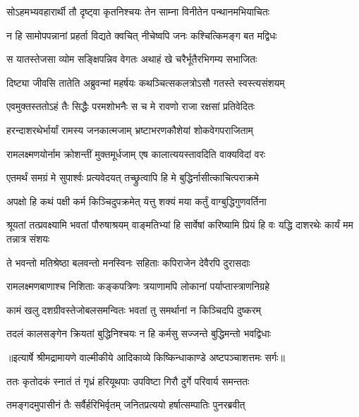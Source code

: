 \twolineshloka
{सोऽहमभ्यवहारार्थी तौ दृष्ट्वा कृतनिश्चयः}
{तेन साम्ना विनीतेन पन्थानमभियाचितः} %

\twolineshloka
{न हि सामोपपन्नानां प्रहर्ता विद्यते क्वचित्}
{नीचेष्वपि जनः कश्चित्किमङ्ग बत मद्विधः} %

\twolineshloka
{स यातस्तेजसा व्योम सङ्क्षिपन्निव वेगतः}
{अथाहं खे चरैर्भूतैरभिगम्य सभाजितः} %

\twolineshloka
{दिष्ट्या जीवसि तातेति अब्रुवन्मां महर्षयः}
{कथञ्चित्सकलत्रोऽसौ गतस्ते स्वस्त्यसंशयम्} %

\twolineshloka
{एवमुक्तस्ततोऽहं तैः सिद्धैः परमशोभनैः}
{स च मे रावणो राजा रक्षसां प्रतिवेदितः} %

\twolineshloka
{हरन्दाशरथेर्भार्यां रामस्य जनकात्मजाम्}
{भ्रष्टाभरणकौशेयां शोकवेगपराजिताम्} %

\twolineshloka
{रामलक्ष्मणयोर्नाम क्रोशन्तीं मुक्तमूर्धजाम्}
{एष कालात्ययस्तावदिति वाक्यविदां वरः} %

\twolineshloka
{एतमर्थं समग्रं मे सुपार्श्वः प्रत्यवेदयत्}
{तच्छ्रुत्वापि हि मे बुद्धिर्नासीत्काचित्पराक्रमे} %

\twolineshloka
{अपक्षो हि कथं पक्षी कर्म किञ्चिदुपक्रमेत्}
{यत्तु शक्यं मया कर्तुं वाग्बुद्धिगुणवर्तिना} %

\threelineshloka
{श्रूयतां तत्प्रवक्ष्यामि भवतां पौरुषाश्रयम्}
{वाङ्मतिभ्यां हि सार्वेषां करिष्यामि प्रियं हि वः}
{यद्धि दाशरथेः कार्यं मम तन्नात्र संशयः} %

\twolineshloka
{ते भवन्तो मतिश्रेष्ठा बलवन्तो मनस्विनः}
{सहिताः कपिराजेन देवैरपि दुरासदाः} %

\twolineshloka
{रामलक्ष्मणबाणाश्च निशिताः कङ्कपत्रिणः}
{त्रयाणामपि लोकानां पर्याप्तास्त्राणनिग्रहे} %

\twolineshloka
{कामं खलु दशग्रीवस्तेजोबलसमन्वितः}
{भवतां तु समर्थानां न किञ्चिदपि दुष्करम्} %

\twolineshloka
{तदलं कालसङ्गेन क्रियतां बुद्धिनिश्चयः}
{न हि कर्मसु सज्जन्ते बुद्धिमन्तो भवद्विधाः} %


{॥इत्यार्षे श्रीमद्रामायणे वाल्मीकीये आदिकाव्ये किष्किन्धाकाण्डे अष्टपञ्चाशत्तमः सर्गः॥}


\twolineshloka
{ततः कृतोदकं स्नातं तं गृध्रं हरियूथपाः}
{उपविष्टा गिरौ दुर्गे परिवार्य समन्ततः} %

\twolineshloka
{तमङ्गदमुपासीनं तैः सर्वैर्हरिभिर्वृतम्}
{जनितप्रत्ययो हर्षात्सम्पातिः पुनरब्रवीत्} %

